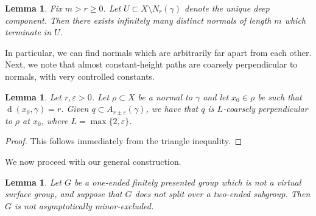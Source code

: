 \documentclass[10pt,a4paper]{amsart}
\DeclareMathOperator{\dist}{d}
\newtheorem{lemma}[theorem]{Lemma}
\theoremstyle{definition}
\begin{document}
\begin{lemma}\label{lem:normals-exist}
    Fix $m > r \geq 0$.  
    Let $U \subset X \setminus N_r(\gamma)$ denote the unique deep component. Then there exists infinitely many distinct normals of length $m$ which terminate in $U$. 
\end{lemma}


In particular, we can find normals which are arbitrarily far apart from each other. 
Next, we note that almost constant-height paths are coarsely perpendicular to normals, with very controlled constants. 


\begin{lemma}\label{lem:constant-height-coarse-perp}
    Let $r, \varepsilon > 0$. Let $\rho \subset X$ be a normal to $\gamma$ and let $x_0 \in \rho$ be such that $\dist(x_0, \gamma) = r$. Given $q \subset A_{r\pm \varepsilon}(\gamma)$, we have that $q$ is $L$-coarsely perpendicular to $\rho$ at $x_0$, where $L = \max\{2,\varepsilon\}$. 
\end{lemma}

\begin{proof}
    This follows immediately from the triangle inequality. 
\end{proof}


We now proceed with our general construction. 


\begin{lemma}\label{lem:no-split}
    Let $G$ be a one-ended finitely presented group which is not a virtual surface group, and suppose that $G$ does not split over a two-ended subgroup. Then $G$ is not asymptotically minor-excluded. 
\end{lemma}
\end{document}
